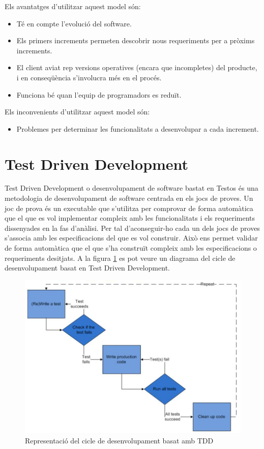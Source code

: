 Els avantatges d’utilitzar aquest model són:

\begin{itemize}
\item{Té en compte l’evolució del software.}
\item{Els primers increments permeten descobrir nous requeriments per a pròxims increments.}
\item{El client aviat rep versions operatives (encara que incompletes) del producte, i en conseqüència s’involucra més en el procés.}
\item{Funciona bé quan l’equip de programadors es reduït.}
\end{itemize}

Els inconvenients d’utilitzar aquest model són:

\begin{itemize}
\item{Problemes per determinar les funcionalitats a desenvolupar a cada increment.}
\end{itemize}


\section{Test Driven Development}
\label{sec:tdd}

Test Driven Development o desenvolupament de software bastat en Testos és una metodologia de desenvolupament de software centrada en els jocs de proves. Un joc de prova és un executable que s'utilitza per comprovar de forma automàtica que el que es vol implementar compleix amb les funcionalitats i els requeriments dissenyades en la fas d'anàlisi. Per tal d'aconseguir-ho cada un dels jocs de proves s'associa amb les especificacions del que es vol construir. Això ens permet validar de forma automàtica que el que s'ha construït compleix amb les especificacions o requeriments desitjats. A la figura \ref{fig:tdd} es pot veure un diagrama del cicle de desenvolupament basat en Test Driven Development.

\begin{figure}[htbp]
\centering\includegraphics[width=12cm]{img/ttd1.jpg}
\caption{Representació del cicle de desenvolupament basat amb TDD}
\label{fig:tdd}
\end{figure} 


